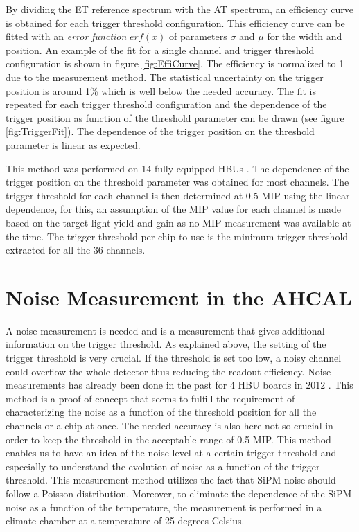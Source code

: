 By dividing the ET reference spectrum with the AT spectrum, an efficiency curve is obtained for each trigger threshold configuration. This efficiency curve can be fitted with an \textit{error function} $erf(x)$ of parameters $\sigma$ and $\mu$ for the width and position. An example of the fit for a single channel and trigger threshold configuration is shown in figure \ref{fig:EffiCurve}. The efficiency is normalized to 1 due to the measurement method. The statistical uncertainty on the trigger position is around 1\% which is well below the needed accuracy. The fit is repeated for each trigger threshold configuration and the dependence of the trigger position as function of the threshold parameter can be drawn (see figure \ref{fig:TriggerFit}). The dependence of the trigger position on the threshold parameter is linear as expected.

This method was performed on 14 fully equipped HBUs \cite{LloydTrigger}. The dependence of the trigger position on the threshold parameter was obtained for most channels. The trigger threshold for each channel is then determined at 0.5 MIP using the linear dependence, for this, an assumption of the MIP value for each channel is made based on the target light yield and gain as no MIP measurement was available at the time. The trigger threshold per chip to use is the minimum trigger threshold extracted for all the 36 channels.

\section{Noise Measurement in the AHCAL}

A noise measurement is needed and is a measurement that gives additional information on the trigger threshold. As explained above, the setting of the trigger threshold is very crucial. If the threshold is set too low, a noisy channel could overflow the whole detector thus reducing the readout efficiency. Noise measurements has already been done in the past for 4 HBU boards in 2012 \cite{Hermberg:2015gaa}. This method is a proof-of-concept that seems to fulfill the requirement of characterizing the noise as a function of the threshold position for all the channels or a chip at once. The needed accuracy is also here not so crucial in order to keep the threshold in the acceptable range of 0.5 MIP. This method enables us to have an idea of the noise level at a certain trigger threshold and especially to understand the evolution of noise as a function of the trigger threshold. This measurement method utilizes the fact that SiPM noise should follow a Poisson distribution. Moreover, to eliminate the dependence of the SiPM noise as a function of the temperature, the measurement is performed in a climate chamber at a temperature of 25 degrees Celsius.

